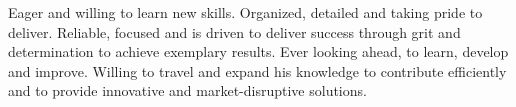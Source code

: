 

\begin{cvparagraph}

Eager and willing to learn new skills. Organized, detailed and taking pride to deliver. Reliable, focused and is driven to deliver success through grit and determination to achieve exemplary results. Ever looking ahead, to learn, develop and improve. Willing to travel and expand his knowledge to contribute efficiently and to provide innovative and market-disruptive solutions.
\end{cvparagraph}
